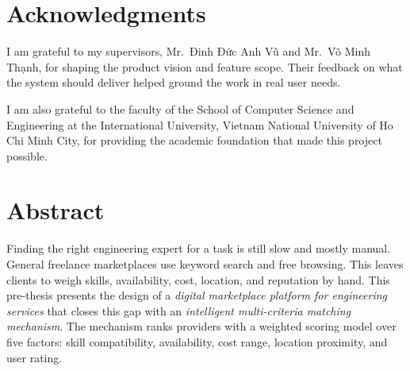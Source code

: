 \documentclass[12pt, twoside]{report}
\begin{document}
\begin{titlepage}
	\hspace{7cm}
	\makebox[7cm][l]{\underline{\hspace{7cm}}}
	\par \hspace{7cm}
	\par
	\vspace{0.75cm}
														
	\hspace{7cm}
	\par
	\thispagestyle{empty}
\end{titlepage}
\restoregeometry
	
\chapter*{Acknowledgments}
I am grateful to my supervisors, Mr.~Đinh Đức Anh Vũ and Mr.~Võ Minh Thạnh, for
shaping the product vision and feature scope. Their feedback on what the system
should deliver helped ground the work in real user needs.

I am also grateful to the faculty of the School of Computer Science and
Engineering at the International University, Vietnam National University of Ho
Chi Minh City, for providing the academic foundation that made this project
possible.
\thispagestyle{empty}

\tableofcontents
\listoftables
{}
\listoffigures
{}
\listofalgorithms
{}

\chapter*{Abstract}
Finding the right engineering expert for a task is still slow and mostly
manual. General freelance marketplaces use keyword search and free browsing.
This leaves clients to weigh skills, availability, cost, location, and
reputation by hand. This pre-thesis presents the design of a
\textit{digital marketplace platform for engineering services} that closes
this gap with an \textit{intelligent multi-criteria matching mechanism}. The
mechanism ranks providers with a weighted scoring model over five factors:
skill compatibility, availability, cost range, location proximity, and user
rating.
\end{document}
